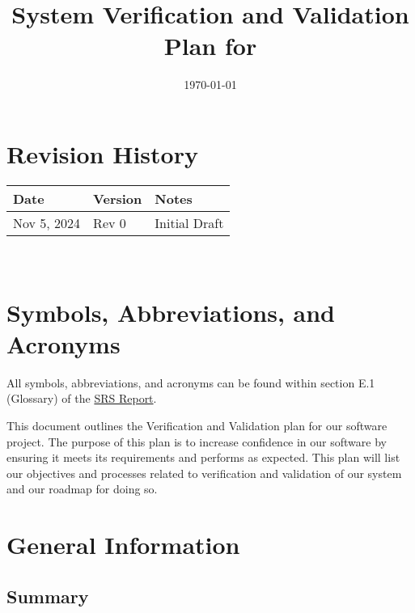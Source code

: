 \documentclass[12pt, titlepage]{article}
\begin{document}
\title{System Verification and Validation Plan for \progname{}} 
\author{\authname}
\date{\today}
	
\maketitle


\section*{Revision History}

\begin{tabularx}{\textwidth}{p{3cm}p{2cm}X}
\toprule {\bf Date} & {\bf Version} & {\bf Notes}\\
\midrule
Nov 5, 2024 & Rev 0 & Initial Draft\\
\bottomrule
\end{tabularx}

~\\

\newpage

\tableofcontents

\listoftables


\newpage

\section{Symbols, Abbreviations, and Acronyms}

All symbols, abbreviations, and acronyms can be found within section E.1 (Glossary) of the \href{https://github.com/takhtart/PCD/blob/main/docs/SRS/SRS.pdf}{SRS Report}.

\newpage


This document outlines the Verification and Validation  plan for our software project. 
The purpose of this plan is to increase confidence in our software by ensuring it meets its requirements and performs as expected. 
This plan will list our objectives and processes related to verification and validation of our system and our roadmap for doing so.

\section{General Information}

\subsection{Summary}
\end{document}
